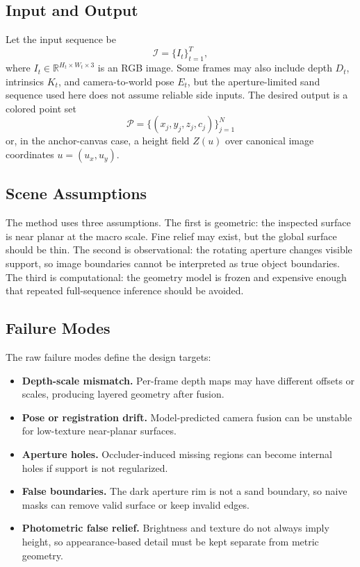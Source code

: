 \documentclass[conference]{IEEEtran}
\begin{document}
\subsection{Input and Output}
Let the input sequence be
\begin{equation}
\mathcal{I}=\{I_t\}_{t=1}^{T},
\end{equation}
where $I_t \in \mathbb{R}^{H_t \times W_t \times 3}$ is an RGB image. Some frames may also include depth $D_t$, intrinsics $K_t$, and camera-to-world pose $E_t$, but the aperture-limited sand sequence used here does not assume reliable side inputs. The desired output is a colored point set
\begin{equation}
\mathcal{P}=\{(x_j,y_j,z_j,c_j)\}_{j=1}^{N}
\end{equation}
or, in the anchor-canvas case, a height field $Z(u)$ over canonical image coordinates $u=(u_x,u_y)$.

\subsection{Scene Assumptions}
The method uses three assumptions. The first is geometric: the inspected surface is near planar at the macro scale. Fine relief may exist, but the global surface should be thin. The second is observational: the rotating aperture changes visible support, so image boundaries cannot be interpreted as true object boundaries. The third is computational: the geometry model is frozen and expensive enough that repeated full-sequence inference should be avoided.

\subsection{Failure Modes}
The raw failure modes define the design targets:
\begin{itemize}
\item \textbf{Depth-scale mismatch.} Per-frame depth maps may have different offsets or scales, producing layered geometry after fusion.
\item \textbf{Pose or registration drift.} Model-predicted camera fusion can be unstable for low-texture near-planar surfaces.
\item \textbf{Aperture holes.} Occluder-induced missing regions can become internal holes if support is not regularized.
\item \textbf{False boundaries.} The dark aperture rim is not a sand boundary, so naive masks can remove valid surface or keep invalid edges.
\item \textbf{Photometric false relief.} Brightness and texture do not always imply height, so appearance-based detail must be kept separate from metric geometry.
\end{itemize}
\end{document}

